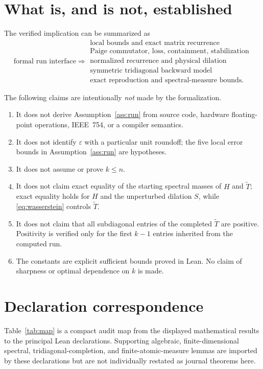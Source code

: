 \documentclass[11pt]{article}
\theoremstyle{definition}
\begin{document}
\section{What is, and is not, established}

The verified implication can be summarized as
\[
 \boxed{\text{formal run interface}}
 \Longrightarrow
 \begin{gathered}
 \text{local bounds and exact matrix recurrence}\\
 \text{Paige commutator, loss, containment, stabilization}\\
 \text{normalized recurrence and physical dilation}\\
 \text{symmetric tridiagonal backward model}\\
 \text{exact reproduction and spectral-measure bounds}.
 \end{gathered}
\]

The following claims are intentionally \emph{not} made by the formalization.

\begin{enumerate}[leftmargin=2.3em]
\item It does not derive Assumption~\ref{ass:run} from source code, hardware
floating-point operations, IEEE~754, or a compiler semantics.
\item It does not identify $\varepsilon$ with a particular unit roundoff; the
five local error bounds in Assumption~\ref{ass:run} are hypotheses.
\item It does not assume or prove $k\leq n$.
\item It does not claim exact equality of the starting spectral masses of
$H$ and $\widetilde T$; exact equality holds for $H$ and the unperturbed
dilation $S$, while \eqref{eq:wasserstein} controls $\widetilde T$.
\item It does not claim that all subdiagonal entries of the completed
$\widetilde T$ are positive.  Positivity is verified only for the first
$k-1$ entries inherited from the computed run.
\item The constants are explicit sufficient bounds proved in Lean.  No claim
of sharpness or optimal dependence on $k$ is made.
\end{enumerate}

\section{Declaration correspondence}

Table~\ref{tab:map} is a compact audit map from the displayed mathematical
results to the principal Lean declarations.  Supporting algebraic,
finite-dimensional spectral, tridiagonal-completion, and finite-atomic-measure
lemmas are imported by these declarations but are not individually restated as
journal theorems here.
\end{document}
